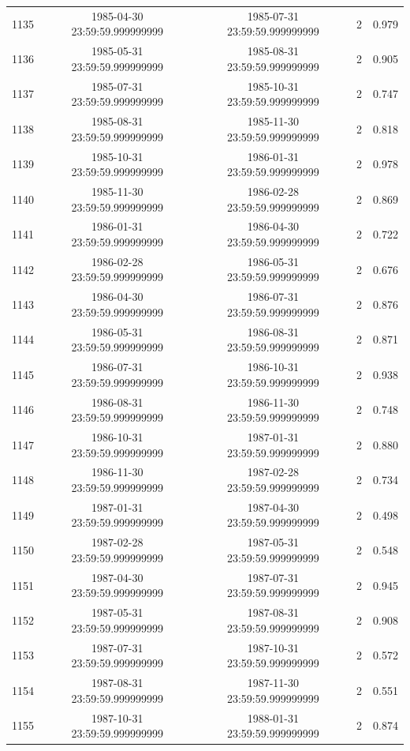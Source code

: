 \begin{table}
\begin{tabular}{lcccc}
1135 & 1985-04-30 23:59:59.999999999 & 1985-07-31 23:59:59.999999999 & 2 & 0.979 \\
1136 & 1985-05-31 23:59:59.999999999 & 1985-08-31 23:59:59.999999999 & 2 & 0.905 \\
1137 & 1985-07-31 23:59:59.999999999 & 1985-10-31 23:59:59.999999999 & 2 & 0.747 \\
1138 & 1985-08-31 23:59:59.999999999 & 1985-11-30 23:59:59.999999999 & 2 & 0.818 \\
1139 & 1985-10-31 23:59:59.999999999 & 1986-01-31 23:59:59.999999999 & 2 & 0.978 \\
1140 & 1985-11-30 23:59:59.999999999 & 1986-02-28 23:59:59.999999999 & 2 & 0.869 \\
1141 & 1986-01-31 23:59:59.999999999 & 1986-04-30 23:59:59.999999999 & 2 & 0.722 \\
1142 & 1986-02-28 23:59:59.999999999 & 1986-05-31 23:59:59.999999999 & 2 & 0.676 \\
1143 & 1986-04-30 23:59:59.999999999 & 1986-07-31 23:59:59.999999999 & 2 & 0.876 \\
1144 & 1986-05-31 23:59:59.999999999 & 1986-08-31 23:59:59.999999999 & 2 & 0.871 \\
1145 & 1986-07-31 23:59:59.999999999 & 1986-10-31 23:59:59.999999999 & 2 & 0.938 \\
1146 & 1986-08-31 23:59:59.999999999 & 1986-11-30 23:59:59.999999999 & 2 & 0.748 \\
1147 & 1986-10-31 23:59:59.999999999 & 1987-01-31 23:59:59.999999999 & 2 & 0.880 \\
1148 & 1986-11-30 23:59:59.999999999 & 1987-02-28 23:59:59.999999999 & 2 & 0.734 \\
1149 & 1987-01-31 23:59:59.999999999 & 1987-04-30 23:59:59.999999999 & 2 & 0.498 \\
1150 & 1987-02-28 23:59:59.999999999 & 1987-05-31 23:59:59.999999999 & 2 & 0.548 \\
1151 & 1987-04-30 23:59:59.999999999 & 1987-07-31 23:59:59.999999999 & 2 & 0.945 \\
1152 & 1987-05-31 23:59:59.999999999 & 1987-08-31 23:59:59.999999999 & 2 & 0.908 \\
1153 & 1987-07-31 23:59:59.999999999 & 1987-10-31 23:59:59.999999999 & 2 & 0.572 \\
1154 & 1987-08-31 23:59:59.999999999 & 1987-11-30 23:59:59.999999999 & 2 & 0.551 \\
1155 & 1987-10-31 23:59:59.999999999 & 1988-01-31 23:59:59.999999999 & 2 & 0.874 \\

\end{tabular}
\end{table}
